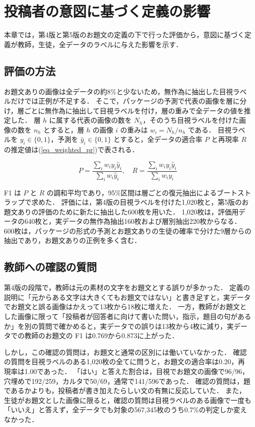 \section{投稿者の意図に基づく定義の影響}
\label{sec_intent}
本章では，第4版と第5版のお題文の定義の下で行った評価から，意図に基づく定義が教師，生徒，全データのラベルに与えた影響を示す．

\subsection{評価の方法}
お題文ありの画像は全データの約8\%と少ないため，無作為に抽出した目視ラベルだけでは正例が不足する．
そこで，パッケージの予測で代表の画像を層に分け，層ごとに無作為に抽出して目視ラベルを付け，層の重みで全データの値を推定した．
層 $ h $ に属する代表の画像の数を $ N_h $，そのうち目視ラベルを付けた画像の数を $ n_h $ とすると，層 $ h $ の画像 $ i $ の重みは $ w_i = N_h / n_h $ である．
目視ラベルを $ y_i \in \{0, 1\} $，予測を $ \hat{y}_i \in \{0, 1\} $ とすると，全データの適合率 $ P $ と再現率 $ R $ の推定値は(\ref{eq_weighted_pr})で表される．

\begin{equation}
    P = \frac{\sum_{i} w_i y_i \hat{y}_i}{\sum_{i} w_i \hat{y}_i}, \quad
    R = \frac{\sum_{i} w_i y_i \hat{y}_i}{\sum_{i} w_i y_i}
    \label{eq_weighted_pr}
\end{equation}

\noindent
F1 は $ P $ と $ R $ の調和平均であり，95\%区間は層ごとの復元抽出によるブートストラップで求めた．
評価には，第4版の目視ラベルを付けた1,020枚と，第5版のお題文ありの評価のために新たに抽出した600枚を用いた．
1,020枚は，評価用データの640枚と，実データの無作為抽出160枚および層別抽出220枚からなる．
600枚は，パッケージの形式の予測とお題文ありの生徒の確率で分けた9層からの抽出であり，お題文ありの正例を多く含む．

\subsection{教師への確認の質問}
第4版の段階で，教師は元の素材の文字をお題文とする誤りが多かった．
定義の説明に「元からある文字は大きくてもお題文ではない」と書き足すと，実データでお題文と誤る画像はかえって13枚から18枚に増えた．
一方，教師がお題文とした画像に限って「投稿者が回答者に向けて書いた問い，指示，題目の句があるか」を別の質問で確かめると，実データでの誤りは13枚から4枚に減り，実データでの教師のお題文の F1 は0.769から0.873に上がった．

しかし，この確認の質問は，お題文と通常の区別には働いていなかった．
確認の質問を目視ラベルのある1,020枚の全てに問うと，お題文の適合率は0.20，再現率は1.00であった．
「はい」と答えた割合は，目視でお題文の画像で96/96，穴埋めで192/259，カルタで50/69，通常で141/596であった．
確認の質問は，題であるかよりも，投稿者が書き加えたらしい文の有無に反応していた．
また，生徒がお題文とした画像に限ると，確認の質問は目視ラベルのある画像で一度も「いいえ」と答えず，全データでも対象の567,345枚のうち0.7\%の判定しか変えなかった．

